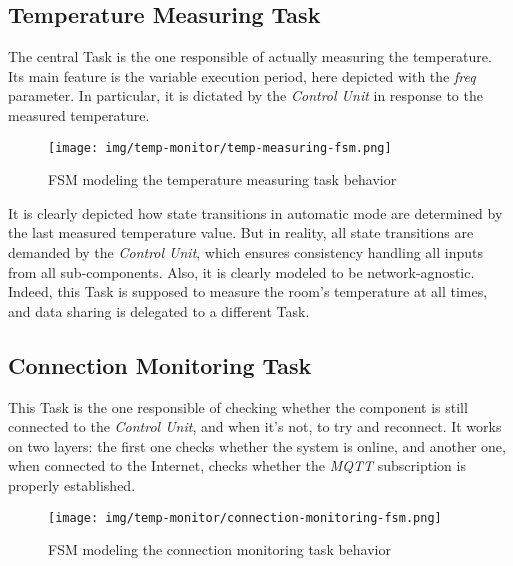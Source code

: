 \documentclass[a4paper,12pt]{report}
\begin{document}
		\subsection{Temperature Measuring Task}
		The central Task is the one responsible of actually measuring the temperature. Its main feature is the variable execution period, here depicted with the \textit{freq} parameter. In particular, it is dictated by the \textit{Control Unit} in response to the measured temperature.
		\begin{figure}[H]
			\centering{}
			\texttt{[image: img/temp-monitor/temp-measuring-fsm.png]}
			\caption{FSM modeling the temperature measuring task behavior}
			\label{img:temp-monitor/temp-measuring-fsm}
		\end{figure}
		It is clearly depicted how state transitions in automatic mode are determined by the last measured temperature value. But in reality, all state transitions are demanded by the \textit{Control Unit}, which ensures consistency handling all inputs from all sub-components.
		\newline Also, it is clearly modeled to be network-agnostic. Indeed, this Task is supposed to measure the room's temperature at all times, and data sharing is delegated to a different Task.
		\subsection{Connection Monitoring Task}
		This Task is the one responsible of checking whether the component is still connected to the \textit{Control Unit}, and when it's not, to try and reconnect. It works on two layers: the first one checks whether the system is online, and another one, when connected to the Internet, checks whether the \textit{MQTT} subscription is properly established.
		\begin{figure}[H]
			\centering{}
			\texttt{[image: img/temp-monitor/connection-monitoring-fsm.png]}
			\caption{FSM modeling the connection monitoring task behavior}
			\label{img:temp-monitor/connection-monitoring-fsm}
		\end{figure}
\end{document}
